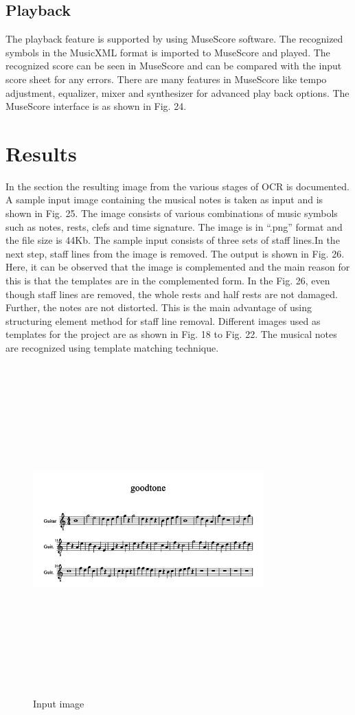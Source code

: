 \documentclass[journal]{IEEEtran}
\begin{document}
\subsection{Playback}
The playback feature is supported by using MuseScore software. The recognized symbols in
the MusicXML format is imported to MuseScore and played. The recognized score can be seen
in MuseScore and can be compared with the input score sheet for any errors. There are many
features in MuseScore like tempo adjustment, equalizer, mixer and synthesizer for advanced play
back options. The MuseScore interface is as shown in Fig. 24.

\section{Results}
In the section the resulting image from the various stages of OCR is documented.  A sample input image containing the musical notes is taken as input and is shown in Fig. 25. The image consists of various combinations of music symbols such as notes, rests, clefs and time signature. The image is in “.png” format and the file size is 44Kb. The sample input consists of three sets of staff lines.In the next step, staff lines from the image is removed. The output is shown in Fig. 26. Here, it can be observed that the image is complemented and the main reason for this is that the templates
are in the complemented form. In the Fig. 26, even though staff lines are removed, the whole rests and half rests are not damaged. Further, the notes are not distorted. This is the main advantage of using structuring element method for staff line removal. Different images used as templates for the project are as shown in Fig. 18 to Fig. 22. The musical notes are recognized using template matching technique. \par
\begin{figure}
\includegraphics[width=3.5in,height=5.0in,clip,keepaspectratio]{resources/results/good_tone}
\centering
\caption{Input image}
\end{figure}
\end{document}
